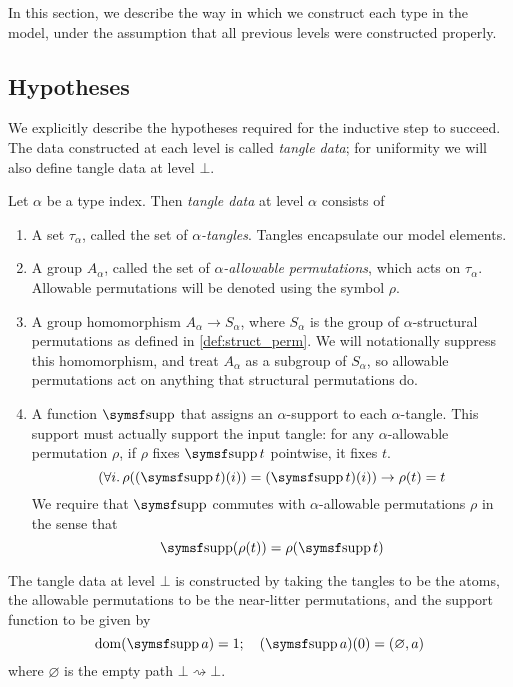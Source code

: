 In this section, we describe the way in which we construct each type in the model, under the assumption that all previous levels were constructed properly.

\subsection{Hypotheses}

We explicitly describe the hypotheses required for the inductive step to succeed.
The data constructed at each level is called \emph{tangle data}; for uniformity we will also define tangle data at level \( \bot \).

\begin{definition}
    Let \( \alpha \) be a type index.
    Then \emph{tangle data} at level \( \alpha \) consists of
    \begin{enumerate}
        \item A set \( \tau_\alpha \), called the set of \emph{\( \alpha \)-tangles}.
        Tangles encapsulate our model elements.
        \item A group \( A_\alpha \), called the set of \emph{\( \alpha \)-allowable permutations}, which acts on \( \tau_\alpha \).
        Allowable permutations will be denoted using the symbol \( \rho \).
        \item A group homomorphism \( A_\alpha \to S_\alpha \), where \( S_\alpha \) is the group of \( \alpha \)-structural permutations as defined in \cref{def:struct_perm}.
        We will notationally suppress this homomorphism, and treat \( A_\alpha \) as a subgroup of \( S_\alpha \), so allowable permutations act on anything that structural permutations do.
        \item A function \( \supp \) that assigns an \( \alpha \)-support to each \( \alpha \)-tangle.
        This support must actually support the input tangle: for any \( \alpha \)-allowable permutation \( \rho \), if \( \rho \) fixes \( \supp t \) pointwise, it fixes \( t \).
        \[ (\forall i.\, \rho((\supp t)(i)) = (\supp t)(i)) \to \rho(t) = t \]
        We require that \( \supp \) commutes with \( \alpha \)-allowable permutations \( \rho \) in the sense that
        \[ \supp(\rho(t)) = \rho(\supp t) \]
    \end{enumerate}
\end{definition}

The tangle data at level \( \bot \) is constructed by taking the tangles to be the atoms, the allowable permutations to be the near-litter permutations, and the support function to be given by
\[ \dom(\supp a) = 1;\quad (\supp a)(0) = (\varnothing, a) \]
where \( \varnothing \) is the empty path \( \bot \rightsquigarrow \bot \).

